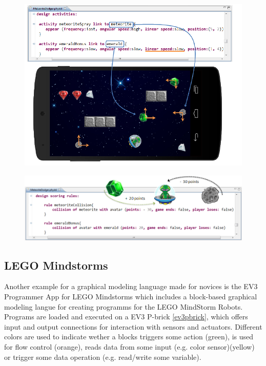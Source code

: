 \documentclass[runningheads,a4paper]{llncs}
\begin{document}
  \begin{figure}[H]
      \centering
      \includegraphics[width=\textwidth]{images/PhyDSL3.PNG}
      \label{activitiesdef}
    \end{figure}

\begin{figure}[H]
      \centering
      \includegraphics[width=\textwidth]{images/PhyDSL4.PNG}
      \label{rulesdef}
    \end{figure}

   \pagebreak
   
   \subsection{LEGO Mindstorms}
   Another example for a graphical modeling language made for novices is the EV3 Programmer App
   for LEGO Mindstorms which includes a block-based graphical modeling langue for creating programms
   for the LEGO MindStorm Robots. Programs are loaded and executed on a EV3 P-brick \ref{ev3pbrick}, 
   which offers input and output connections for interaction with sensors and actuators.
   Different colors are used to indicate wether a blocks triggers some action (green), is used for flow control (orange),
   reads data from some input (e.g. color sensor)(yellow) or trigger some data operation (e.g. read/write some variable).
   
\end{document}
